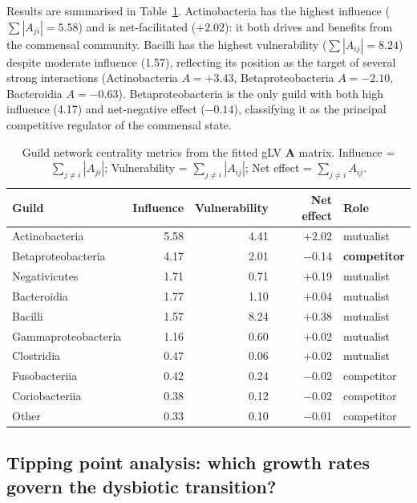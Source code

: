 \documentclass[11pt,a4paper]{article}
\newcommand{\bA}{\mathbf{A}}
\begin{document}
Results are summarised in Table~\ref{tab:network}.
Actinobacteria has the highest influence ($\sum|A_{ji}|=5.58$) and is
net-facilitated ($+2.02$): it both drives and benefits from the commensal community.
Bacilli has the highest vulnerability ($\sum|A_{ij}|=8.24$) despite moderate
influence (1.57), reflecting its position as the target of several strong
interactions (Actinobacteria $A=+3.43$, Betaproteobacteria $A=-2.10$,
Bacteroidia $A=-0.63$).
Betaproteobacteria is the only guild with both high influence (4.17) and
net-negative effect ($-0.14$), classifying it as the principal competitive
regulator of the commensal state.

\begin{table}[htb]
\centering
\caption{Guild network centrality metrics from the fitted gLV $\bA$ matrix.
Influence = $\sum_{j\neq i}|A_{ji}|$; Vulnerability = $\sum_{j\neq i}|A_{ij}|$;
Net effect = $\sum_{j\neq i}A_{ij}$.}
\label{tab:network}
\small
\begin{tabular}{lrrrl}
\toprule
Guild & Influence & Vulnerability & Net effect & Role \\
\midrule
Actinobacteria      & 5.58 & 4.41 & $+$2.02 & mutualist \\
Betaproteobacteria  & 4.17 & 2.01 & $-$0.14 & \textbf{competitor} \\
Negativicutes       & 1.71 & 0.71 & $+$0.19 & mutualist \\
Bacteroidia         & 1.77 & 1.10 & $+$0.04 & mutualist \\
Bacilli             & 1.57 & 8.24 & $+$0.38 & mutualist \\
Gammaproteobacteria & 1.16 & 0.60 & $+$0.02 & mutualist \\
Clostridia          & 0.47 & 0.06 & $+$0.02 & mutualist \\
Fusobacteriia       & 0.42 & 0.24 & $-$0.02 & competitor \\
Coriobacteriia      & 0.38 & 0.12 & $-$0.02 & competitor \\
Other               & 0.33 & 0.10 & $-$0.01 & competitor \\
\bottomrule
\end{tabular}
\end{table}

\subsection{Tipping point analysis: which growth rates govern the dysbiotic transition?}
\label{ssec:tipping}
\end{document}
